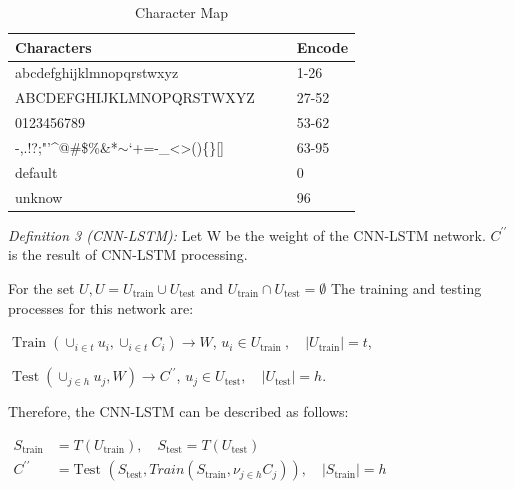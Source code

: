 \documentclass{ieeeaccess}
\begin{document}
\begin{table}[htp]
\caption{Character Map}
\label{table:1}
\begin{tabular}{llll}
\hline
Characters                                                                            &  &  & Encode \\ \hline
abcdefghijklmnopqrstwxyz                                                              &  &  & 1-26   \\
ABCDEFGHIJKLMNOPQRSTWXYZ                                                              &  &  & 27-52  \\
0123456789                                                                            &  &  & 53-62  \\
-,.!?;"'\textasciicircum{}@\#\$\%\&*$\sim$`+=-\_\textless{}\textgreater{}()\{\}{[}{]} &  &  & 63-95  \\
default                                                                               &  &  & 0      \\
unknow                                                                                &  &  & 96     \\ \hline
\end{tabular}
\end{table}\par \vspace{4pt}
\textit{Definition 3 (CNN-LSTM):} Let W be the weight of
the CNN-LSTM network. $C^{\prime \prime}$ is the result of CNN-LSTM
processing.\par For the set $U, U=U_{\text {train}} \cup U_{\text {test}}$ and $U_{\text {train}} \cap U_{\text {test}}=\emptyset$ The training and testing processes for this network are:\par \vspace{4pt} $\operatorname{Train}\left(\cup_{i \in t} u_{i}, \cup_{i \in t} C_{i}\right) \rightarrow W$,   $u_{i} \in U_{\text {train }}, \quad\left|U_{\text {train}}\right|=t$,\par \vspace{4pt} $\operatorname{Test}\left(\cup_{j \in h} u_{j}, W\right) \rightarrow C^{\prime \prime}$,   $u_{j} \in U_{\text {test}}, \quad\left|U_{\text {test}}\right|=h$.\par Therefore, the CNN-LSTM can be described as follows:\par \vspace{4pt} $\begin{aligned} S_{\text {train}} &=T\left(U_{\text {train}}\right), \quad S_{\text {test}}=T\left(U_{\text {test}}\right) \\ C^{\prime \prime} &=\text {Test }\left(S_{\text {test}}, T r a i n\left(S_{\text {train}}, \nu_{j \in h} C_{j}\right)\right), \quad\left|S_{\text {train}}\right|=h \end{aligned}$
\end{document}
